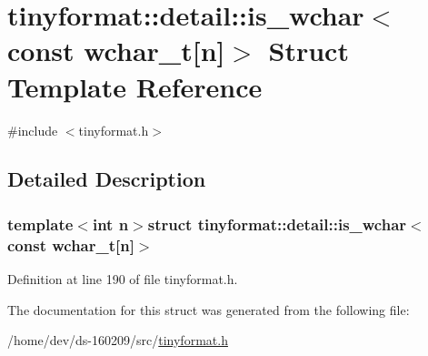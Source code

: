 \hypertarget{structtinyformat_1_1detail_1_1is__wchar_3_01const_01wchar__t[n]_4}{}\section{tinyformat\+:\+:detail\+:\+:is\+\_\+wchar$<$ const wchar\+\_\+t\mbox{[}n\mbox{]}$>$ Struct Template Reference}
\label{structtinyformat_1_1detail_1_1is__wchar_3_01const_01wchar__t[n]_4}


{\ttfamily \#include $<$tinyformat.\+h$>$}



\subsection{Detailed Description}
\subsubsection*{template$<$int n$>$struct tinyformat\+::detail\+::is\+\_\+wchar$<$ const wchar\+\_\+t\mbox{[}n\mbox{]}$>$}



Definition at line 190 of file tinyformat.\+h.



The documentation for this struct was generated from the following file\+:\begin{DoxyCompactItemize}
\item 
/home/dev/ds-\/160209/src/\hyperlink{tinyformat_8h}{tinyformat.\+h}\end{DoxyCompactItemize}
